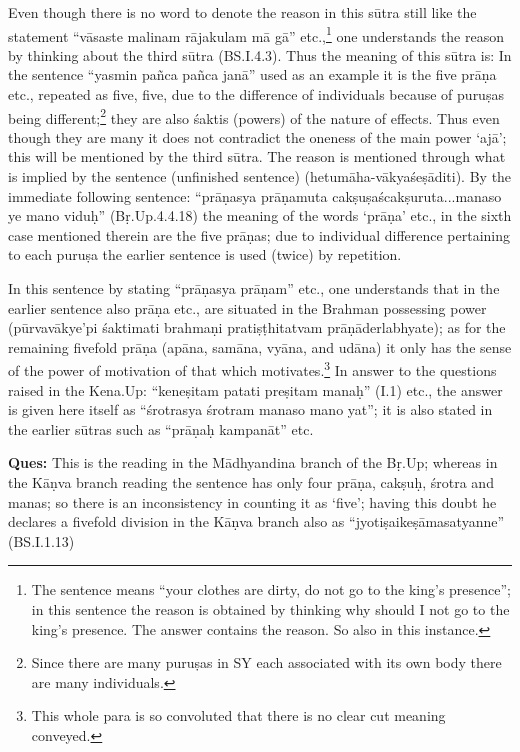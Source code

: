 Even though there is no word to denote the reason in this sūtra still like the statement “vāsaste malinam rājakulam mā gā” etc.,\footnote{The sentence means “your clothes are dirty, do not go to the king’s presence”; in this sentence the reason is obtained by thinking why should I not go to the king’s presence. The answer contains the reason. So also in this instance.} one understands the reason by thinking about the third sūtra (BS.I.4.3). Thus the meaning of this sūtra is: In the sentence “yasmin pañca pañca janā” used as an example it is the five prāṇa etc., repeated as five, five, due to the difference of individuals because of puruṣas being different;\footnote{Since there are many puruṣas in SY each associated with its own body there are many individuals.} they are also śaktis (powers) of the nature of effects. Thus even though they are many it does not contradict the oneness of the main power ‘ajā’; this will be mentioned by the third sūtra. The reason is mentioned through what is implied by the sentence  (unfinished sentence) (hetumāha-vākyaśeṣāditi). By the immediate following sentence: “prāṇasya prāṇamuta cakṣuṣaścakṣuruta...manaso ye mano viduḥ” (Bṛ.Up.4.4.18) the meaning of the words ‘prāṇa’ etc., in the sixth case mentioned therein are the five prāṇas; due to  individual difference pertaining to each puruṣa the earlier sentence is used (twice) by repetition.

In this sentence by stating “prāṇasya prāṇam” etc., one understands that in the earlier sentence also prāṇa etc., are situated in the Brahman possessing power (pūrvavākye’pi śaktimati brahmaṇi pratiṣṭhitatvam prāṇāderlabhyate); as for the remaining fivefold prāṇa (apāna, samāna, vyāna, and udāna) it only has the sense of the power of motivation of that which motivates.\footnote{This whole para is so convoluted that there is no clear cut meaning conveyed.} In answer to the questions raised in the Kena.Up: “keneṣitam patati preṣitam manaḥ” (I.1) etc.,  the answer is given here itself as “śrotrasya śrotram manaso mano yat”; it is also stated in the earlier sūtras such as “prāṇaḥ kampanāt” etc. 

\textbf{Ques:} This is the reading in the Mādhyandina branch of the Bṛ.Up; whereas in the  Kāṇva branch reading the sentence has only four  prāṇa, cakṣuḥ, śrotra and manas; so there is an inconsistency in counting it as ‘five’;  having this doubt he declares a fivefold division in the Kāṇva branch also as “jyotiṣaikeṣāmasatyanne” (BS.I.1.13)

\vskip -2pt

